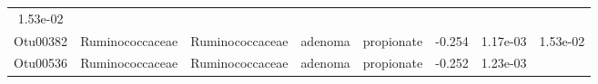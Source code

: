 \documentclass[11pt,]{article}
\begin{document}
\begin{longtable}[]{@{}cccccccc@{}}
\begin{minipage}[t]{0.08\columnwidth}
1.53e-02\strut
\end{minipage}\tabularnewline
\begin{minipage}[t]{0.08\columnwidth}\centering\strut
Otu00382\strut
\end{minipage} & \begin{minipage}[t]{0.15\columnwidth}\centering\strut
Ruminococcaceae\strut
\end{minipage} & \begin{minipage}[t]{0.15\columnwidth}\centering\strut
Ruminococcaceae\strut
\end{minipage} & \begin{minipage}[t]{0.08\columnwidth}\centering\strut
adenoma\strut
\end{minipage} & \begin{minipage}[t]{0.09\columnwidth}\centering\strut
propionate\strut
\end{minipage} & \begin{minipage}[t]{0.07\columnwidth}\centering\strut
-0.254\strut
\end{minipage} & \begin{minipage}[t]{0.08\columnwidth}\centering\strut
1.17e-03\strut
\end{minipage} & \begin{minipage}[t]{0.08\columnwidth}\centering\strut
1.53e-02\strut
\end{minipage}\tabularnewline
\begin{minipage}[t]{0.08\columnwidth}\centering\strut
Otu00536\strut
\end{minipage} & \begin{minipage}[t]{0.15\columnwidth}\centering\strut
Ruminococcaceae\strut
\end{minipage} & \begin{minipage}[t]{0.15\columnwidth}\centering\strut
Ruminococcaceae\strut
\end{minipage} & \begin{minipage}[t]{0.08\columnwidth}\centering\strut
adenoma\strut
\end{minipage} & \begin{minipage}[t]{0.09\columnwidth}\centering\strut
propionate\strut
\end{minipage} & \begin{minipage}[t]{0.07\columnwidth}\centering\strut
-0.252\strut
\end{minipage} & \begin{minipage}[t]{0.08\columnwidth}\centering\strut
1.23e-03\strut
\end{minipage} & \begin{minipage}[t]{0.08\columnwidth}\centering\strut

\end{minipage}
\end{longtable}
\end{document}
